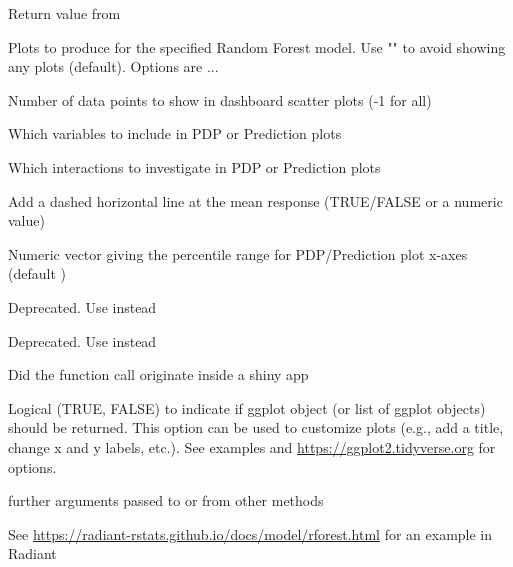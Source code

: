 \documentclass[a4paper]{book}
\begin{document}
\begin{Arguments}
\begin{ldescription}
\item[\code{x}] Return value from 

\item[\code{plots}] Plots to produce for the specified Random Forest model. Use "" to avoid showing any plots (default). Options are ...

\item[\code{nrobs}] Number of data points to show in dashboard scatter plots (-1 for all)

\item[\code{incl}] Which variables to include in PDP or Prediction plots

\item[\code{incl\_int}] Which interactions to investigate in PDP or Prediction plots

\item[\code{hline}] Add a dashed horizontal line at the mean response (TRUE/FALSE or a numeric value)

\item[\code{pdp\_range}] Numeric vector  giving the percentile range for PDP/Prediction plot x-axes (default )

\item[\code{minq}] Deprecated. Use  instead

\item[\code{maxq}] Deprecated. Use  instead

\item[\code{shiny}] Did the function call originate inside a shiny app

\item[\code{custom}] Logical (TRUE, FALSE) to indicate if ggplot object (or list of ggplot objects) should be returned.
This option can be used to customize plots (e.g., add a title, change x and y labels, etc.). See examples
and \url{https://ggplot2.tidyverse.org} for options.

\item[\code{...}] further arguments passed to or from other methods
\end{ldescription}
\end{Arguments}
%
\begin{Details}
See \url{https://radiant-rstats.github.io/docs/model/rforest.html} for an example in Radiant
\end{Details}
\end{document}
